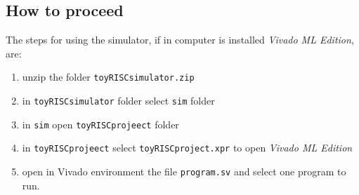 \subsection{How to proceed}\label{testProcedure}

The steps for using the simulator, if in computer is installed {\em Vivado ML Edition}, are:
\begin{enumerate}
    \item unzip the folder {\tt toyRISCsimulator.zip}
    \item in {\tt toyRISCsimulator} folder select {\tt sim} folder
    \item in {\tt sim} open {\tt toyRISCprojeect} folder
    \item in {\tt toyRISCprojeect} select {\tt toyRISCproject.xpr} to open {\em Vivado ML Edition} 
    \item open in Vivado environment the file {\tt program.sv} and select one program to run.
\end{enumerate}